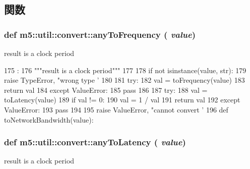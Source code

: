 \subsection{関数}
\hypertarget{namespacem5_1_1util_1_1convert_ad6ddb873408a6cb4ba9cb4f93b608d4d}{
\subsubsection[{anyToFrequency}]{\setlength{\rightskip}{0pt plus 5cm}def m5::util::convert::anyToFrequency ( {\em value})}}
\label{namespacem5_1_1util_1_1convert_ad6ddb873408a6cb4ba9cb4f93b608d4d}
\begin{DoxyVerb}result is a clock period\end{DoxyVerb}
 


\begin{DoxyCode}
175                          :
176     """result is a clock period"""
177 
178     if not isinstance(value, str):
179         raise TypeError, "wrong type '%
180 
181     try:
182         val = toFrequency(value)
183         return val
184     except ValueError:
185         pass
186 
187     try:
188         val = toLatency(value)
189         if val != 0:
190             val = 1 / val
191         return val
192     except ValueError:
193         pass
194 
195     raise ValueError, "cannot convert '%
196 
def toNetworkBandwidth(value):
\end{DoxyCode}
\hypertarget{namespacem5_1_1util_1_1convert_ad311c20fe1562644cda013c3984dc66f}{
\subsubsection[{anyToLatency}]{\setlength{\rightskip}{0pt plus 5cm}def m5::util::convert::anyToLatency ( {\em value})}}
\label{namespacem5_1_1util_1_1convert_ad311c20fe1562644cda013c3984dc66f}
\begin{DoxyVerb}result is a clock period\end{DoxyVerb}
 


